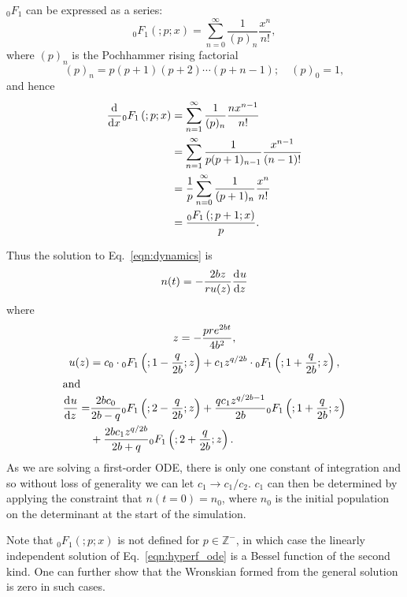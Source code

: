 \documentclass[a4paper, 11pt]{article}
\newcommand{\dd}[3][\null]{\frac{\mathrm{d}^{#1}{#2}}{\mathrm{d}{#3}^{#1}}}
\newcommand{\hyperF}[2]{{_0}F_1\left(;#1;#2\right)}
\begin{document}
${_0}F_1$ can be expressed as a series:
\begin{equation}
\hyperF{p}{x} = \sum_{n=0}^{\infty} \frac{1}{(p)_n} \frac{x^n}{n!},
\end{equation}
where $(p)_n$ is the Pochhammer rising factorial
\begin{equation}
(p)_n = p(p+1)(p+2)\cdots(p+n-1); \quad (p)_0 = 1,
\end{equation}
and hence
\begin{align}
\dd{\null}{x} \hyperF{p}{x} &= \sum_{n=1}^{\infty} \frac{1}{(p)_n} \frac{n x^{n-1}}{n!} \\
                            &= \sum_{n=1}^{\infty} \frac{1}{p(p+1)_{n-1}} \frac{x^{n-1}}{(n-1)!} \\
                            &= \frac{1}{p} \sum_{n=0}^{\infty} \frac{1}{(p+1)_n} \frac{x^n}{n!} \\
                            &= \frac{\hyperF{p+1}{x}}{p}.
\end{align}

Thus the solution to Eq.~\ref{eqn:dynamics} is 
\begin{equation}
n(t) = -\frac{2bz}{ru(z)}\dd{u}{z}
\end{equation}
where
\begin{gather}
z = -\frac{pre^{2bt}}{4b^2}, \\
u(z) = c_0\cdot\hyperF{1-\frac{q}{2b}}{z} + c_1 z^{q/2b}\cdot\hyperF{1+\frac{q}{2b}}{z}, \\
\intertext{and}
\begin{split}
\dd{u}{z} = &\frac{2bc_0}{2b-q}\hyperF{2-\frac{q}{2b}}{z} + \frac{q c_1 z^{q/2b-1}}{2b}\hyperF{1+\frac{q}{2b}}{z} \\ &+ \frac{2bc_1z^{q/2b}}{2b+q}\hyperF{2+\frac{q}{2b}}{z}.
\end{split}
\end{gather}
As we are solving a first-order ODE, there is only one constant of integration and so without loss of generality we can let $c_1 \rightarrow c_1/c_2$.  $c_1$ can then be determined by applying the constraint that $n(t=0)=n_0$, where $n_0$ is the initial population on the determinant at the start of the simulation.

Note that $\hyperF{p}{x}$ is not defined for $p\in\mathbb{Z}^{-}$, in which case the linearly independent solution of Eq.~\ref{eqn:hyperf_ode} is a Bessel function of the second kind.  One can further show that the Wronskian formed from the general solution is zero in such cases.
\end{document}
